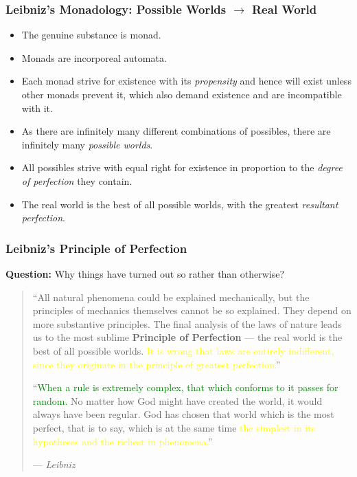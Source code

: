 \documentclass[UTF8,11pt,colorlinks,compress,openany]{beamer}%
\begin{document}
\begin{frame}\frametitle{Leibniz's Monadology: Possible Worlds $\to$ Real World}
\begin{itemize}
	\item The genuine substance is monad.
	\item Monads are incorporeal automata.
	\item Each monad strive for existence with its \emph{propensity} and hence will exist unless other monads prevent it, which also demand existence and are incompatible with it.
	\item As there are infinitely many different combinations of possibles, there are infinitely many \emph{possible worlds}.
	\item All possibles strive with equal right for existence in proportion to the \emph{degree of perfection} they contain.
	\item The real world is the best of all possible worlds, with the greatest \emph{resultant perfection}.
\end{itemize}
\end{frame}

\begin{frame}\frametitle{Leibniz's Principle of Perfection}
\textbf{Question:} Why things have turned out so rather than otherwise?
\begin{quote}
``All natural phenomena could be explained mechanically, but the principles of mechanics themselves cannot be so explained. They depend on more substantive principles. The final analysis of the laws of nature leads us to the most sublime \textbf{Principle of Perfection} --- the real world is the best of all possible worlds. \textcolor{yellow}{It is wrong that laws are entirely indifferent, since they originate in the principle of greatest perfection.}''

``\textcolor{green}{When a rule is extremely complex, that which conforms to it passes for random.} No matter how God might have created the world, it would always have been regular. God has chosen that world which is the most perfect, that is to say, which is at the same time \textcolor{yellow}{the simplest in its hypotheses and the richest in phenomena.}''\par
\hfill --- \textsl{Leibniz}
\end{quote}
\end{frame}
\end{document}
